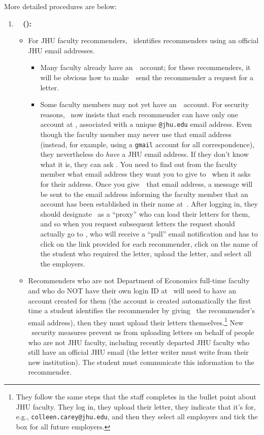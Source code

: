 \documentclass{\econtex}
\begin{document}
More detailed procedures are below:
\begin{enumerate}

\item \textbf{\EJM ~ (\EJMLink):}
  \begin{itemize}
  \item For JHU faculty recommenders, \EJM~identifies recommenders using
    an official JHU email addresses.  

    \begin{itemize}
    \item Many faculty already have an~\EJM~account; for these
      recommenders, it will be obvious how to make~\EJM~send the
      recommender a request for a letter.

    \item Some faculty members may not yet have an~\EJM~account.  
      For security reasons, \EJM~now insists that each
      recommender can have only one account at \EJM, associated with a
      unique \texttt{@jhu.edu} email address.  Even though the faculty member may never use
      that email address (instead, for example, using a \texttt{gmail}
      account for all correspondence), they nevertheless do \textit{    have} a
      JHU email address.  If they don't know what it is, they can ask
      \jmstaffemail.  You need to find out from the faculty member what email
      address they want you to give to \EJM~when it asks for their address.  Once you
      give~\EJM~that email address, a message will be sent to the email
      address informing the faculty member that an account has been
      established in their name at~\EJM.  After logging in, they should
      designate \jmstaffemail~as a ``proxy'' who can load their letters
      for them, and so when you request subsequent letters the request should
      actually go to \jmstaffemail, who will receive a ``pull'' email
      notification and has to click on the link provided for each
      recommender, click on the name of the student who required the
      letter, upload the letter, and select all the employers.

    \end{itemize}


  \item Recommenders who are not Department of Economics full-time faculty and who do NOT have their own
    login ID at \EJM~will need to have an account created for them (the account is created automatically the first time a student identifies the recommender by giving \EJM~the recommender's email address), then they must upload their letters themselves.\footnote{They follow the same steps that the
      staff completes in the bullet point about JHU faculty.  They
      log in, they upload their letter, they indicate that it's for, e.g.,
      \texttt{colleen.carey@jhu.edu}, and then they select all employers and tick the box for all
      future employers.}
    New \EJM~security measures prevent us from uploading letters on behalf of people
    who are not JHU faculty, including recently departed JHU faculty who still have an official JHU email (the letter writer must write from their new institution).  The student must communicate this information to  the recommender.


\end{itemize}
\end{enumerate}
\end{document}
